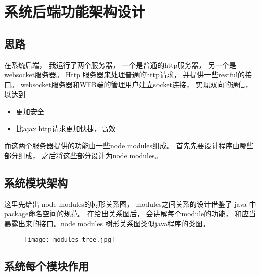 \section{系统后端功能架构设计}


\subsection{思路}

在系统后端， 我运行了两个服务器， 一个是普通的http服务器， 另一个是websocket服务器。 Http 服务器来处理普通的http请求， 并提供一些restful的接口。 websocket服务器和WEB端的管理用户建立socket连接， 实现双向的通信， 以达到

\begin{itemize}
	\item 更加安全
	\item 比ajax http请求更加快捷，高效
\end{itemize}





而这两个服务器提供的功能由一些node modules组成。 首先先要设计程序由哪些部分组成， 之后将这些部分设计为node modules。

\subsection{系统模块架构}

这里先给出 node modules的树形关系图， modules之间关系的设计借鉴了 java 中package命名空间的规范。 在给出关系图后， 会讲解每个module的功能， 和应当暴露出来的接口。node modules 树形关系图类似java程序的类图。

\newpage
\begin{figure}[H]
	\centering
	\vspace*{7cm}\texttt{[image: modules\_tree.jpg]}
	\label{fig: modules}
\end{figure}

\newpage
\subsection{系统每个模块作用}

